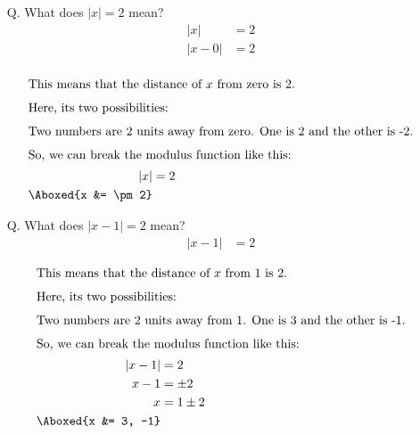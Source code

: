 \begin{enumerate}
    \item[Q.] What does $|x|=2$ mean?
        \begin{align*}
            |x| &= 2\\
            |x-0| &= 2\\
        \end{align*}
        \begin{center}
        \end{center}
        \begin{align*}
            \intertext{This means that the distance of $x$ from zero is 2.}
            \intertext{Here, its two possibilities:}
            \intertext{Two numbers are 2 units away from zero. One is 2 and the other is -2.}
            \intertext{So, we can break the modulus function like this:}
            |x| &= 2\\
            \Aboxed{x &= \pm 2}
        \end{align*}

    \item[Q.] What does $|x-1|=2$ mean?
        \begin{align*}
            |x-1| &= 2
        \end{align*}
        \begin{center}
        \end{center}
        \begin{align*}
            \intertext{This means that the distance of $x$ from 1 is 2.}
            \intertext{Here, its two possibilities:}
            \intertext{Two numbers are 2 units away from 1. One is 3 and the other is -1.}
            \intertext{So, we can break the modulus function like this:}
            |x-1| &= 2\\
            x-1 &= \pm 2\\
            x &= 1 \pm 2\\
            \Aboxed{x &= 3, -1}
        \end{align*}


\end{enumerate}
